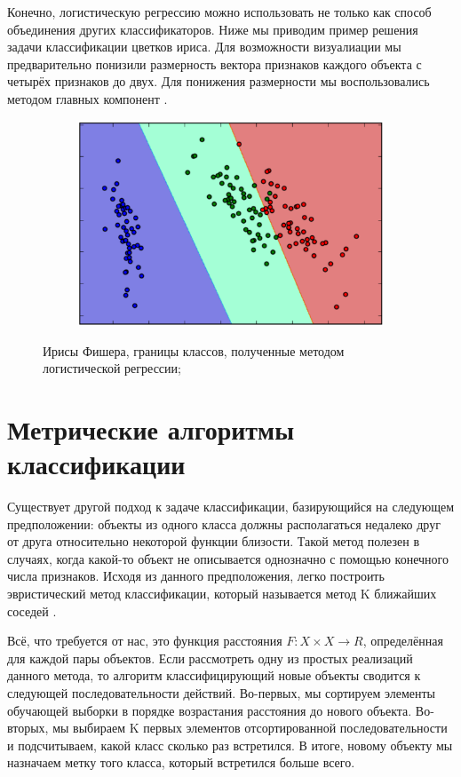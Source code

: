 Конечно, логистическую регрессию можно использовать не только как способ объединения других классификаторов. Ниже мы приводим пример решения задачи классификации цветков ириса. Для возможности визуалиации мы предварительно понизили размерность вектора признаков каждого объекта с четырёх признаков до двух. Для понижения размерности мы воспользовались методом главных компонент \cite{pca_book}\cite{pca_program}.

\begin{figure}[ht]
	\centering
    \begin{subfigure}[b]{1\textwidth}
    \centering
        \includegraphics[scale=0.5]{pasted-image-19.png}        
    \end{subfigure}
 
    \caption{Ирисы Фишера, границы классов, полученные методом логистической регрессии;}
    \label{fig_parsetree}
\end{figure}

\section{Метрические алгоритмы классификации}

Существует другой подход к задаче классификации, базирующийся на следующем предположении: объекты из одного класса должны располагаться недалеко друг от друга относительно некоторой функции близости. Такой метод полезен в случаях, когда какой-то объект не описывается однозначно с помощью конечного числа признаков. Исходя из данного предположения, легко построить эвристический метод классификации, который называется метод K ближайших соседей \cite{knn}.

Всё, что требуется от нас, это функция расстояния $F : X \times X \to R$, определённая для каждой пары объектов. Если рассмотреть одну из простых реализаций данного метода, то алгоритм классифицирующий новые объекты сводится к следующей последовательности действий.
Во-первых, мы сортируем элементы обучающей выборки в порядке возрастания  расстояния до нового объекта.
Во-вторых, мы выбираем K первых элементов отсортированной последовательности и подсчитываем, какой класс сколько раз встретился.
В итоге, новому объекту мы назначаем метку того класса, который встретился больше всего.

